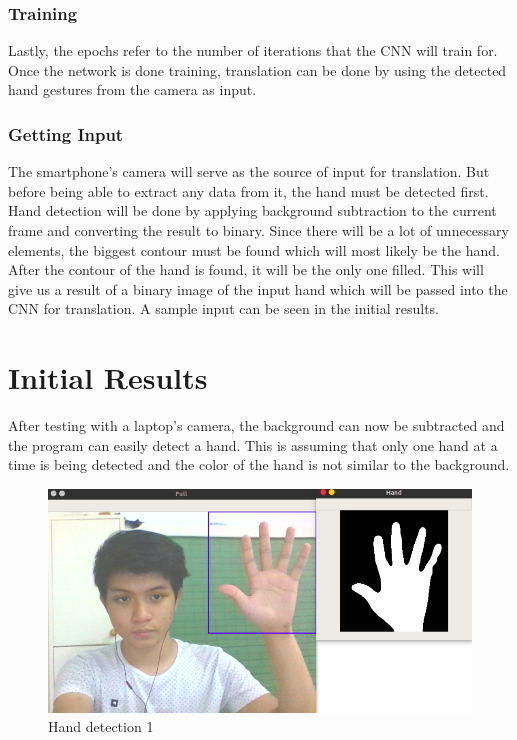 \documentclass[journal]{./IEEE/IEEEtran}
\begin{document}
\subsubsection{Training}
Lastly, the epochs refer to the number of iterations that the CNN will train for. Once the network is done training, translation can be done by using the detected hand gestures from the camera as input.
\newline
\subsubsection{Getting Input}
The smartphone’s camera will serve as the source of input for translation. But before being able to extract any data from it, the hand must be detected first. Hand detection will be done by applying background subtraction to the current frame and converting the result to binary. Since there will be a lot of unnecessary elements, the biggest contour must be found which will most likely be the hand. After the contour of the hand is found, it will be the only one filled. This will give us a result of a binary image of the input hand which will be passed into the CNN for translation. A sample input can be seen in the initial results.

\section{Initial Results}
After testing with a laptop's camera, the background can now be subtracted and the program can easily detect a hand. This is assuming that only one hand at a time is being detected and the color of the hand is not similar to the background.

\begin{figure}[ht!]
    \centering
    \includegraphics[width=.8\linewidth]{./images/init1.png}
    \caption{Hand detection 1}
    \label{fig:label1}
\end{figure}
\end{document}
